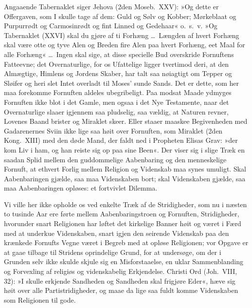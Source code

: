 \documentclass[12pt,a4paper]{article}
\begin{document}
Angaaende Tabernaklet siger Jehova (2den Moseb.\ XXV): »Og dette er
Offergaven, som I skulle tage af dem: Guld og Sølv og Kobber; Mørkeblaat
og Purpurrødt og Carmosinrødt og fint Linned og Gedehaar« o.\ s.\ v.
»Og Tabernaklet (XXVI) skal du gjøre af ti Forhæng \ldots\ Længden af
hvert Forhæng skal være otte og tyve Alen og Breden fire Alen paa hvert
Forhæng, eet Maal for alle Forhæng« \ldots\ Ingen skal sige, at disse
specielle Bud overskride Fornuftens Fatteevne; det Overnaturlige, for
os Ufattelige ligger tvertimod deri, at den Almægtige, Himlens og
Jordens Skaber, har talt saa nøiagtigt om Tepper og Sløifer og heri
slet Intet overladt til Moses' sunde Sands. Det er dette, som her maa
forekomme Fornuften aldeles ubegribeligt. Paa modsat Maade ydmyges
Fornuften ikke blot i det Gamle, men ogsaa i det Nye Testamente, naar
det Overnaturlige slaaer igjennem saa pludselig, saa vældig, at Naturen
revner, Lovenes Baand brister og Miraklet skeer. Eller staaer maaskee
Begivenheden med Gadarenernes Sviin ikke lige saa høit over Fornuften,
som Miraklet (2den Kong.\ XIII) med den døde Mand, der faldt ned i
Propheten Elisas Grav: »der kom Liv i ham, og han reiste sig op paa
sine Been«. Der viser sig i slige Træk en saadan Splid mellem den
guddommelige Aabenbaring og den menneskelige Fornuft, at ethvert
Forlig mellem Religion og Videnskab maa synes umuligt. Skal
Aabenbaringen gjælde, saa maa Videnskaben bort; skal Videnskaben
gjælde, saa maa Aabenbaringen opløses: et fortvivlet Dilemma.

Vi ville her ikke opholde os ved enkelte Træk af de Stridigheder, som
nu i næsten to tusinde Aar ere førte mellem Aabenbaringstroen og
Fornuften, Stridigheder, hvorunder snart Religionen har løftet det
kirkelige Banner høit og været i Færd med at underkue Videnskaben,
snart igjen den seirende Videnskab paa den krænkede Fornufts Vegne
været i Begreb med at opløse Religionen; vor Opgave er at gaae tilbage
til Stridens oprindelige Grund, for at undersøge, om der i Grunden
selv ikke skulde skjule sig en Misforstaaelse, en uklar Sammenblanding
og Forvexling af religiøs og videnskabelig Erkjendelse. Christi Ord
(Joh.\ VIII, 32): »I skulle erkjende Sandheden og Sandheden skal
frigjøre Eder«, hæve sig høit over alle Partistridigheder, og maae da
lige saa fuldt komme Videnskaben som Religionen til gode.
\end{document}
